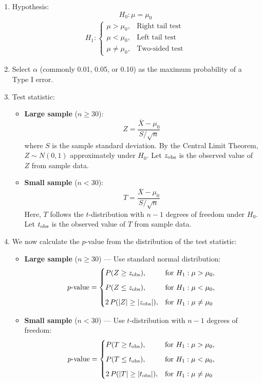 \documentclass[twoside]{book}
\begin{document}
\begin{enumerate}
	\item Hypothesis:
	$$H_0: \mu = \mu_0$$
	\begin{align*}
	H_1: \begin{cases}
	\mu > \mu_0, & \text{Right tail test}\\[6pt]
	\mu < \mu_0, & \text{Left tail test}\\[6pt]
	\mu \neq \mu_0, & \text{Two-sided test}
	\end{cases}
	\end{align*}

	\item Select \(\alpha\) (commonly 0.01, 0.05, or 0.10) as the maximum probability of a Type I error.

	\item Test statistic:

	\begin{itemize}
		\item \textbf{Large sample} (\(n \ge 30\)):
		\[
		Z = \frac{\overline{X} - \mu_0}{S / \sqrt{n}}
		\]
		where \(S\) is the sample standard deviation.
		By the Central Limit Theorem, \(Z \sim N(0, 1)\) approximately under \(H_0\). Let \(z_{\rm obs}\) is the observed value of \(Z\) from sample data.

		\item \textbf{Small sample} (\(n < 30\)):
		\[
		T = \frac{\overline{X} - \mu_0}{S / \sqrt{n}}
		\]
		Here, \(T\) follows the \(t\)-distribution with \(n - 1\) degrees of freedom under \(H_0\). Let \(t_{\rm obs}\) is the observed value of \(T\) from sample data.
	\end{itemize}

	\item We now calculate the \(p\)-value from the distribution of the test statistic:

	\begin{itemize}
		\item \textbf{Large sample} (\(n \ge 30\)) — Use standard normal distribution:
		\[
		p\text{-value} =
		\begin{cases}
		P(Z \ge z_{\rm obs}), & \text{for }H_1:\mu>\mu_0,\\[6pt]
		P(Z \le z_{\rm obs}), & \text{for }H_1:\mu<\mu_0,\\[6pt]
		2\,P(|Z| \ge |z_{\rm obs}|), & \text{for }H_1:\mu\neq\mu_0
		\end{cases}
		\]

		\item \textbf{Small sample} (\(n < 30\)) — Use \(t\)-distribution with \(n-1\) degrees of freedom:
		\[
		p\text{-value} =
		\begin{cases}
		P(T \ge t_{\rm obs}), & \text{for }H_1:\mu>\mu_0,\\[6pt]
		P(T \le t_{\rm obs}), & \text{for }H_1:\mu<\mu_0,\\[6pt]
		2\,P(|T| \ge |t_{\rm obs}|), & \text{for }H_1:\mu\neq\mu_0
		\end{cases}
		\]
	\end{itemize}


\end{enumerate}
\end{document}
